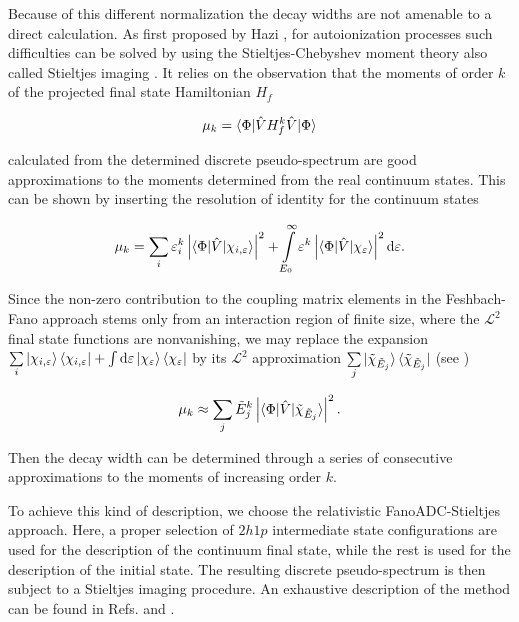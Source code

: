 \documentclass[aps,amssymb,preprint,a4paper]{revtex4}
\begin{document}
Because of this different normalization the decay widths are not amenable to
a direct calculation. As first proposed by Hazi \cite{hazi1978}, for
autoionization processes such difficulties
can be solved by using the
Stieltjes-Chebyshev moment theory also called Stieltjes imaging
\cite{Langhoff76,Corcoran77,MuellerPlathe90}.
It relies on the observation that the moments of order $k$ of the projected final
state Hamiltonian $H_f$

\begin{equation}
 \mu_k = \braket{ \Phi | \hat{V} H^k_f \hat{V} | \Phi }
\end{equation}

calculated from the determined
discrete pseudo-spectrum are good approximations to the moments determined
from the real continuum states.
This can be shown by inserting the resolution of identity for
the continuum states

\begin{equation}
 \mu_k = \sum_i \varepsilon_i^k
         \left| \braket{ \Phi | \hat{V} | \chi_{i,\varepsilon} } \right| ^2
       + \int\limits_{E_{0}}^{\infty} \varepsilon^k
         \left| \braket{\Phi|\hat{V}|\chi_{\varepsilon}} \right|^2 \mathrm{d}\varepsilon  .
\end{equation}

Since the non-zero contribution to the coupling matrix elements in the
Feshbach-Fano approach stems only
from an interaction region of finite size, where the $\mathcal{L}^2$ final
state functions are nonvanishing, we may replace the expansion
$\sum\limits_i \ket{\chi_{i,\varepsilon}} \bra{\chi_{i,\varepsilon}}
 + \int \mathrm{d}\varepsilon \ket{\chi_\varepsilon} \bra{\chi_\varepsilon}$
by its $\mathcal{L}^2$ approximation
$\sum\limits_j \ket{\tilde{\chi}_{\tilde{E}_j}} \bra{\tilde{\chi}_{\tilde{E}_j}}$
(see \cite{Reinhardt79})

\begin{equation}
 \label{eq:moment_discrete}
 \mu_k \approx \sum\limits_j \tilde{E}_j ^k
         \left| \braket{\Phi|\hat{V}|\tilde{\chi}_{\tilde{E}_j}}  \right|^2 .
\end{equation}

Then the decay width can be determined through a series of
consecutive approximations to the moments of increasing order $k$.

To achieve this kind of description, we choose the relativistic
FanoADC-Stieltjes approach.
Here, a proper selection of $2h1p$ intermediate state configurations are used
for the description of the continuum final state,
while the rest is used for the description
of the initial state.
The resulting discrete pseudo-spectrum
is then subject to a Stieltjes imaging procedure.
An exhaustive description of the method can be found in Refs. \cite{Fasshauer15_1}
and \cite{Fasshauer_thesis}.
\end{document}
